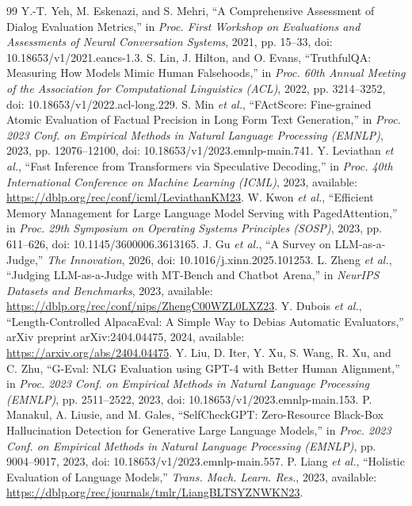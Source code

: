﻿\documentclass[a4paper,12pt]{article}
\begin{document}
\begin{thebibliography}{99}
 Y.-T. Yeh, M. Eskenazi, and S. Mehri, ``A Comprehensive Assessment of Dialog Evaluation Metrics,'' in \emph{Proc. First Workshop on Evaluations and Assessments of Neural Conversation Systems}, 2021, pp. 15--33, doi: 10.18653/v1/2021.eancs-1.3.
 S. Lin, J. Hilton, and O. Evans, ``TruthfulQA: Measuring How Models Mimic Human Falsehoods,'' in \emph{Proc. 60th Annual Meeting of the Association for Computational Linguistics (ACL)}, 2022, pp. 3214--3252, doi: 10.18653/v1/2022.acl-long.229.
 S. Min \emph{et al.}, ``FActScore: Fine-grained Atomic Evaluation of Factual Precision in Long Form Text Generation,'' in \emph{Proc. 2023 Conf. on Empirical Methods in Natural Language Processing (EMNLP)}, 2023, pp. 12076--12100, doi: 10.18653/v1/2023.emnlp-main.741.
 Y. Leviathan \emph{et al.}, ``Fast Inference from Transformers via Speculative Decoding,'' in \emph{Proc. 40th International Conference on Machine Learning (ICML)}, 2023, available: \url{https://dblp.org/rec/conf/icml/LeviathanKM23}.
 W. Kwon \emph{et al.}, ``Efficient Memory Management for Large Language Model Serving with PagedAttention,'' in \emph{Proc. 29th Symposium on Operating Systems Principles (SOSP)}, 2023, pp. 611--626, doi: 10.1145/3600006.3613165.
 J. Gu \emph{et al.}, ``A Survey on LLM-as-a-Judge,'' \emph{The Innovation}, 2026, doi: 10.1016/j.xinn.2025.101253.
 L. Zheng \emph{et al.}, ``Judging LLM-as-a-Judge with MT-Bench and Chatbot Arena,'' in \emph{NeurIPS Datasets and Benchmarks}, 2023, available: \url{https://dblp.org/rec/conf/nips/ZhengC00WZL0LXZ23}.
 Y. Dubois \emph{et al.}, ``Length-Controlled AlpacaEval: A Simple Way to Debias Automatic Evaluators,'' arXiv preprint arXiv:2404.04475, 2024, available: \url{https://arxiv.org/abs/2404.04475}.
 Y. Liu, D. Iter, Y. Xu, S. Wang, R. Xu, and C. Zhu, ``G-Eval: NLG Evaluation using GPT-4 with Better Human Alignment,'' in \emph{Proc. 2023 Conf. on Empirical Methods in Natural Language Processing (EMNLP)}, pp. 2511--2522, 2023, doi: 10.18653/v1/2023.emnlp-main.153.
 P. Manakul, A. Liusie, and M. Gales, ``SelfCheckGPT: Zero-Resource Black-Box Hallucination Detection for Generative Large Language Models,'' in \emph{Proc. 2023 Conf. on Empirical Methods in Natural Language Processing (EMNLP)}, pp. 9004--9017, 2023, doi: 10.18653/v1/2023.emnlp-main.557.
 P. Liang \emph{et al.}, ``Holistic Evaluation of Language Models,'' \emph{Trans. Mach. Learn. Res.}, 2023, available: \url{https://dblp.org/rec/journals/tmlr/LiangBLTSYZNWKN23}.

\end{thebibliography}
\end{document}
